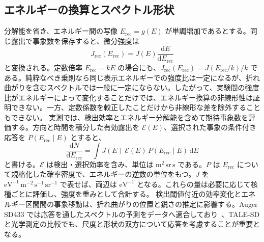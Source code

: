 \documentclass[book,paper=a4,fontsize=11pt]{jlreq}
\begin{document}
\subsection{エネルギーの換算とスペクトル形状}
分解能を省き、エネルギー間の写像 \(E_{\mathrm{rec}}=g(E)\) が単調増加であるとする。同じ露出で事象数を保存すると、微分強度は
\begin{equation}
  J_{\mathrm{rec}}(E_{\mathrm{rec}})
  =J(E)\frac{\mathrm dE}{\mathrm dE_{\mathrm{rec}}}
  \label{eq:spectrum_energy_mapping}
\end{equation}
と変換される。定数倍率 \(E_{\mathrm{rec}}=kE\) の場合にも、\(J_{\mathrm{rec}}(E_{\mathrm{rec}})=J(E_{\mathrm{rec}}/k)/k\) である。純粋なべき乗則なら同じ表示エネルギーでの強度比は一定になるが、折れ曲がりを含むスペクトルでは一般に一定にならない。したがって、実験間の強度比がエネルギーによって変化することだけでは、エネルギー換算の非線形性は証明できない。一方、定数係数を較正したことだけから非線形な差を除外することもできない。
実測では、検出効率とエネルギー分解能を含めて期待事象数を評価する。方向と時間を積分した有効露出を \(\mathcal E(E)\)、選択された事象の条件付き応答を \(P(E_{\mathrm{rec}}\mid E)\) とすると、
\begin{equation}
  \frac{\mathrm dN}{\mathrm dE_{\mathrm{rec}}}
  =\int J(E)\,\mathcal E(E)\,P(E_{\mathrm{rec}}\mid E)\,\mathrm dE
  \label{eq:spectrum_response}
\end{equation}
と書ける。\(\mathcal E\) は検出・選択効率を含み、単位は \(\mathrm{m^2\,sr\,s}\) である。\(P\) は \(E_{\mathrm{rec}}\) について規格化した確率密度で、エネルギーの逆数の単位をもつ。\(J\) を \(\mathrm{eV^{-1}\,m^{-2}\,s^{-1}\,sr^{-1}}\) で表せば、両辺は \(\mathrm{eV^{-1}}\) となる。これらの量は必要に応じて核種ごとに評価し、強度を重みとして合計する。
検出閾値付近の効率変化とエネルギー区間間の事象移動は、折れ曲がりの位置と鋭さの推定に影響する。Auger SD433 では応答を通したスペクトルの予測をデータへ適合しており~\cite{AugerSD4332023}、TALE-SD と光学測定の比較でも、尺度と形状の双方について応答を考慮することが重要となる。

\backmatter
\cleardoublepage
{}
{}
\renewcommand{\refname}{参考文献}


\end{document}
